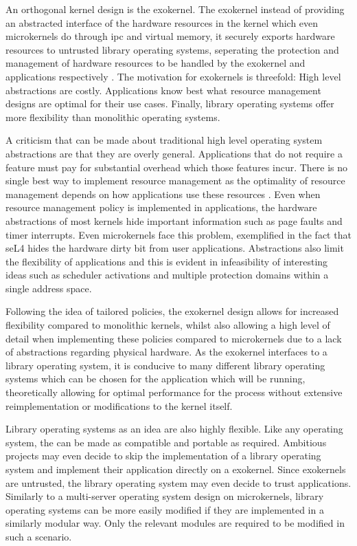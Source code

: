 \documentclass[literature_review.tex]{subfiles}
\begin{document}
    An orthogonal kernel design is the exokernel. The exokernel instead of providing an abstracted interface of the hardware resources in the kernel which even microkernels do through \gls{ipc} and virtual memory, it securely exports hardware resources to untrusted library operating systems, seperating the protection and management of hardware resources to be handled by the exokernel and applications respectively \citep{Engler_KO_95}. The motivation for exokernels is threefold: High level abstractions are costly. Applications know best what resource management designs are optimal for their use cases. Finally, library operating systems offer more flexibility than monolithic operating systems. 

    A criticism that can be made about traditional high level operating system abstractions are that they are overly general. Applications that do not require a feature must pay for substantial overhead which those features incur.  There is no single best way to implement resource management as the optimality of resource management depends on how applications use these resources . Even when resource management policy is implemented in applications, the hardware abstractions of most kernels hide important information such as page faults and timer interrupts. Even microkernels face this problem, exemplified in the fact that seL4 hides the hardware dirty bit from user applications.  Abstractions also limit the flexibility of applications and this is evident in infeasibility of interesting ideas such as scheduler activations and multiple protection domains within a single address space. 

Following the idea of tailored policies, the exokernel design allows for increased flexibility compared to monolithic kernels, whilst also allowing a high level of detail when implementing these policies compared to microkernels due to a lack of abstractions regarding physical hardware. As the exokernel interfaces to a library operating system, it is conducive to many different library operating systems which can be chosen for the application which will be running, theoretically allowing for optimal performance for the process without extensive reimplementation or modifications to the kernel itself.

Library operating systems as an idea are also highly flexible. Like any operating system, the can be made as compatible and portable as required. Ambitious projects may even decide to skip the implementation of a library operating system and implement their application directly on a exokernel. Since exokernels are untrusted, the library operating system may even decide to trust applications. Similarly to a multi-server operating system design on microkernels, library operating systems can be more easily modified if they are implemented in a similarly modular way. Only the relevant modules are required to be modified in such a scenario.
\end{document}

